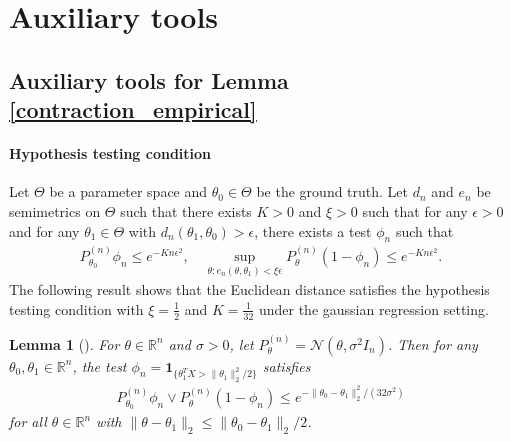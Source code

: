 \documentclass{article}
\newcommand{\R}{\mathbb{R}}
\newcommand{\N}{\mathcal{N}}
\theoremstyle{plain}
\newtheorem{lemma}[theorem]{Lemma}
\theoremstyle{definition}
\theoremstyle{remark}
\begin{document}
\section{Auxiliary tools}

\subsection{Auxiliary tools for Lemma \ref{contraction_empirical}}

\paragraph{Hypothesis testing condition} Let $\Theta$ be a parameter space and $\theta_0 \in \Theta$ be the ground truth. Let $d_n$ and $e_n$ be semimetrics on $\Theta$ such that there exists $K > 0$ and $\xi > 0$ such that for any $\epsilon > 0$ and for any $\theta_1 \in \Theta$ with $d_n(\theta_1, \theta_0) > \epsilon$, there exists a test $\phi_n$ such that 
\begin{align} \label{hypothesis_testing_condition}
    P_{\theta_0}^{(n)} \phi_n \leq e^{-K n \epsilon^2 }, \quad \sup_{\theta: e_n(\theta, \theta_1) < \xi \epsilon} P_\theta^{(n)} (1 - \phi_n ) \leq e^{-K n \epsilon^2}. 
\end{align}
The following result shows that the Euclidean distance satisfies the hypothesis testing condition with $\xi = \frac{1}{2}$ and $K = \frac{1}{32}$ under the gaussian regression setting.
\begin{lemma}[{\citep[Lemma 8.27]{ghosal2017fundamentals}}] \label{testing_lemma}
For $\theta \in \R^n$ and $\sigma > 0$, let $P_\theta^{(n)} = \N(\theta, \sigma^2 I_n)$. Then for any $\theta_0, \theta_1 \in \R^n$, the test $\phi_n = \mathbf{1}_{\{\theta_1^T X >\|\theta_1\|^2_2/2\}}$ satisfies
\begin{align*}
    P_{\theta_0}^{(n)} \phi_n \vee P_{\theta}^{(n)} (1 - \phi_n) \leq e^{- \|\theta_0 - \theta_1\|_2^2 / (32\sigma^2)}
\end{align*}
for all $\theta \in \R^n$ with $\|\theta - \theta_1\|_2 \leq \|\theta_0 - \theta_1\|_2/2$.
\end{lemma}
\end{document}
